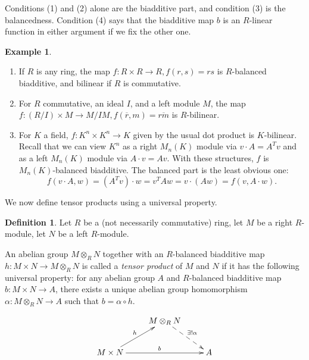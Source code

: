 \documentclass{amsart}[12pt]
\def\ov#1{{\overline{#1}}}
\newcommand{\DEF}[1]{\emph{#1}\index{#1}}
\numberwithin{equation}{section}
\theoremstyle{plain} %
\theoremstyle{definition}
\newtheorem{defn}[equation]{Definition}
\newtheorem{ex}[equation]{Example}
\theoremstyle{remark}
\def\ov#1{\overline{#1}}
\begin{document}
Conditions (1) and (2) alone are the biadditive part, and condition (3) is the balancedness. Condition (4) says that the biadditive map $b$ is an $R$-linear function in either argument if we fix the other one.

\begin{ex} 
\begin{enumerate}
\item If $R$ is any ring, the map $f:R\times R \to R, f(r,s)=rs$ is $R$-balanced biadditive, and bilinear if $R$ is commutative.
\item For $R$ commutative, an ideal $I$, and a left module $M$, the map $f:(R/I)\times M\to M/IM, f(\ov{r},m)=\ov{rm}$ is $R$-bilinear.
\item For $K$ a field, $f:K^n\times K^n \to K$ given by the usual dot product is $K$-bilinear. Recall that we can view $K^n$ as a right $M_n(K)$ module via $v \cdot A = A^T v$ and as a left $M_n(K)$ module via $A\cdot v = Av$. With these structures, $f$ is $M_n(K)$-balanced biadditive. The balanced part is the least obvious one:
\[ f(v \cdot A,w) = (A^T v) \cdot w = v^T A w = v \cdot (Aw) = f(v, A\cdot w).\]
\end{enumerate}
\end{ex}

We now define tensor products using a universal property.

\begin{defn}
\label{def:tensorprod}
  Let $R$ be a (not necessarily commutative) ring, let $M$ be a right $R$-module, let $N$ be a left $R$-module. 

An abelian group $M \otimes_R N$ together with an $R$-balanced biadditive map $h : M\times N \to M\otimes_R N$ is called a \DEF{tensor product} of $M$ and $N$ if it has the following universal property: for any abelian group $A$ and $R$-balanced biadditive map $b : M\times N \to A$, there exists a unique abelian group homomorphism $\alpha : M \otimes_R N\to A$ such that $b = \alpha \circ h$.

\[
\xymatrix{
& M\otimes_R N  \ar@{-->}[dr]^{\exists ! \alpha}&\\
 M\times N \ar[ur]^h \ar[rr]^b& & A
}
\]
\end{defn}
\end{document}
